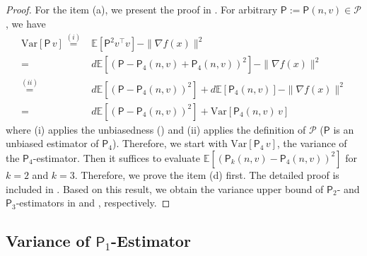 \documentclass{article}
\newcommand{\Var}{\mathrm{Var}}
\newcommand{\EE}{\mathbb{E}}
\theoremstyle{definition}
\theoremstyle{plain}
\theoremstyle{remark}
\newcommand{\sfP}{\mathsf{P}}
\begin{document}
\begin{proof} For the item (a), we present the proof in .  For arbitrary $\sfP:= \sfP(n,v)\in \mathscr{P}$, we have
\begin{align*}
    \Var[\sfP \, v ]  \overset{(i)}{=} & \EE[\sfP^2 v^\top v] - \|\nabla f(x)\|^2 \\ 
     = & d\EE[(\sfP- \sfP_4(n,v) +  \sfP_4(n,v) )^2  ] - \|\nabla f(x)\|^2 \\ 
     \overset{(ii)}{=}&d\EE[(\sfP- \sfP_4(n,v))^2  ] + d\EE[ \sfP_4(n,v) ] - \|\nabla f(x)\|^2  \\ 
     = & d\EE[(\sfP- \sfP_4(n,v))^2  ] + \Var[\sfP_4(n,v)\, v]
\end{align*}
where (i) applies the unbiasedness () and (ii) applies the definition of  $\mathscr{P}$ ($\sfP$ is an unbiased estimator of $\sfP_4$). Therefore, we start with $\Var[\sfP_4\, v]$, the variance of the $\sfP_4$-estimator. Then it suffices to evaluate $\EE[(\sfP_k(n,v)- \sfP_4(n,v))^2  ]$ for $k=2$ and $k=3$. Therefore, we prove the item (d) first. The detailed proof is included in . Based on this result, we obtain the variance upper bound of $\sfP_2$- and $\sfP_3$-estimators in  and , respectively.
\end{proof}

\subsection{Variance of $\mathsf{P}_1$-Estimator} %
\end{document}
